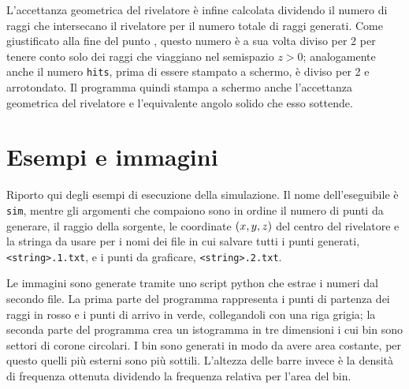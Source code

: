         L'accettanza geometrica del rivelatore è infine calcolata dividendo il numero di raggi che intersecano il rivelatore per il numero totale di raggi generati. Come giustificato alla fine del punto , questo numero è a sua volta diviso per \num{2} per tenere conto solo dei raggi che viaggiano nel semispazio $z > 0$; analogamente anche il numero \verb|hits|, prima di essere stampato a schermo, è diviso per \num{2} e arrotondato. Il programma quindi stampa a schermo anche l'accettanza geometrica del rivelatore e l'equivalente angolo solido che esso sottende.

    \section{Esempi e immagini}
        Riporto qui degli esempi di esecuzione della simulazione. Il nome dell'eseguibile è \verb|sim|, mentre gli argomenti che compaiono sono in ordine il numero di punti da generare, il raggio della sorgente, le coordinate $\pqty{x,y,z}$ del centro del rivelatore e la stringa da usare per i nomi dei file in cui salvare tutti i punti generati, \verb|<string>.1.txt|, e i punti da graficare, \verb|<string>.2.txt|.

        Le immagini sono generate tramite uno script python che estrae i numeri dal secondo file. La prima parte del programma rappresenta i punti di partenza dei raggi in rosso e i punti di arrivo in verde, collegandoli con una riga grigia; la seconda parte del programma crea un istogramma in tre dimensioni i cui bin sono settori di corone circolari. I bin sono generati in modo da avere area costante, per questo quelli più esterni sono più sottili. L'altezza delle barre invece è la densità di frequenza ottenuta dividendo la frequenza relativa per l'area del bin.

